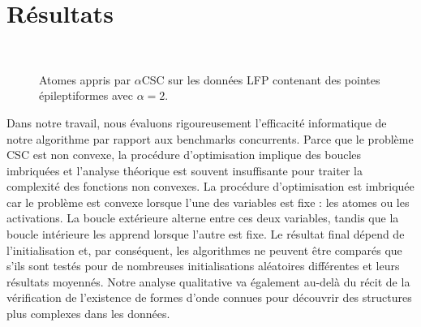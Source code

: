 \section*{Résultats}
\begin{figure}[htb]
    \centering
              \\

            \caption[]{Atomes appris par $\alpha$CSC sur les données LFP contenant des pointes épileptiformes avec $\alpha=2$.}
            \label{fig:sommaire:spikedata}
\end{figure}

Dans notre travail, nous évaluons rigoureusement l'efficacité informatique de notre algorithme par rapport aux benchmarks concurrents. Parce que le problème CSC est non convexe, la procédure d'optimisation implique des boucles imbriquées et l'analyse théorique est souvent insuffisante pour traiter la complexité des fonctions non convexes. La procédure d'optimisation est imbriquée car le problème est convexe lorsque l'une des variables est fixe : les atomes ou les activations. La boucle extérieure alterne entre ces deux variables, tandis que la boucle intérieure les apprend lorsque l'autre est fixe. Le résultat final dépend de l'initialisation et, par conséquent, les algorithmes ne peuvent être comparés que s'ils sont testés pour de nombreuses initialisations aléatoires différentes et leurs résultats moyennés. Notre analyse qualitative va également au-delà du récit de la vérification de l'existence de formes d'onde connues pour découvrir des structures plus complexes dans les données.

